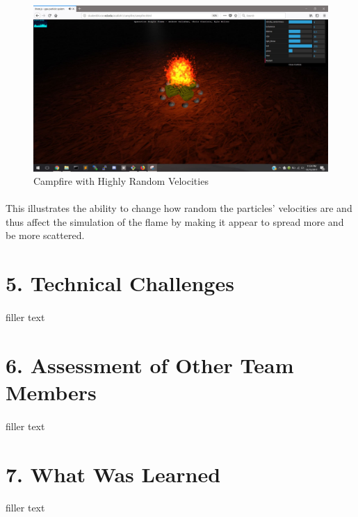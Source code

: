 \documentclass[letterpaper]{article}
\begin{document}
\begin{figure}[H]
\centering
\includegraphics[scale=.35]{result9.JPG}
\caption{Campfire with Highly Random Velocities}
\label{fig:result9}
\end{figure}
\paragraph{}
This illustrates the ability to change how random the particles' velocities are and thus affect the simulation of the flame by making it appear to spread more and be more scattered.


\section*{5. Technical Challenges}

\paragraph*{}
    filler text

\section*{6. Assessment of Other Team Members}

\paragraph*{}
    filler text
\section*{7. What Was Learned}

\paragraph*{}
    filler text
\end{document}
